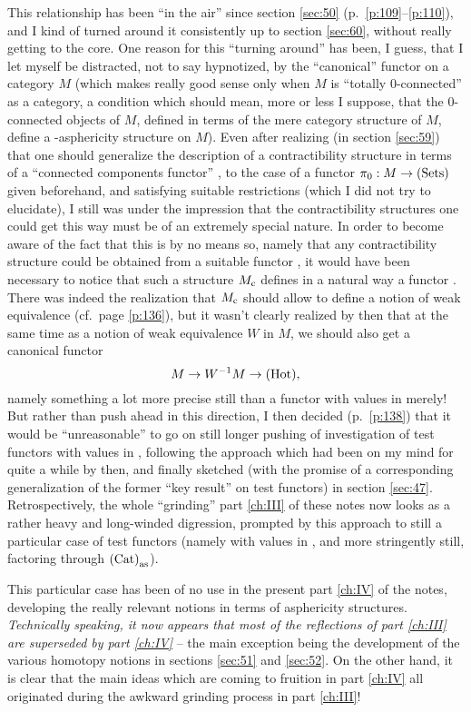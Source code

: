 This relationship has been ``in the air'' since section \ref{sec:50}
(p.\ \ref{p:109}--\ref{p:110}), and I kind of turned around it
consistently up to section \ref{sec:60}, without really getting to the
core. One reason for this ``turning around'' has been, I guess, that I
let myself be distracted, not to say hypnotized, by the ``canonical''
\piz{} functor on a category $M$ (which makes really good sense only
when $M$ is ``totally $0$-connected'' as a category, a condition which
should mean, more or less I suppose, that the $0$-connected objects of
$M$, defined in terms of the mere category structure of $M$, define a
\scrWz-asphericity structure on $M$). Even after realizing (in section
\ref{sec:59}) that one should generalize the description of a
contractibility structure in terms of a ``connected components
functor'' \piz, to the case of a functor ${\pi_0}: M\to{\ensuremath{(\mathrm{Sets})}}$ given
beforehand, and satisfying suitable restrictions (which I did not try
to elucidate), I still was under the impression that the
contractibility structures one could get this way must be of an
extremely special nature. In order to become aware of the fact that
this is by no means so, namely that any contractibility structure
could be obtained from a suitable functor \piz, it would have been
necessary to notice that such a structure $M_{\mathrm{c}}$ defines in a
natural way a functor \piz. There was indeed the realization that
$M_{\mathrm{c}}$ should allow to define a notion of weak equivalence (cf.\
page \ref{p:136}), but it wasn't clearly realized by then that at the
same time as a notion of weak equivalence $W$ in $M$, we should also
get a canonical functor
\[M \to W^{-1}M \to {\ensuremath{(\mathrm{Hot})}},\]
namely something a lot more precise still than a functor with values
in \Sets{} merely! But rather than push ahead in this direction, I
then decided (p.\ \ref{p:138}) that it would be ``unreasonable'' to go
on still longer pushing of investigation of test functors with values
in \Cat, following the approach which had been on my mind for quite a
while by then, and finally sketched (with the promise of a
corresponding generalization of the former ``key result'' on test
functors) in section \ref{sec:47}. Retrospectively, the whole
``grinding'' part \ref{ch:III} of these notes now looks as a rather
heavy and long-winded digression, prompted by this approach to still a
particular case of test functors (namely with values in \Cat, and
more stringently still, factoring through ${(\mathrm{Cat})}_{\mathrm{as}}$).

This particular case has been of no use in the present part
\ref{ch:IV} of the notes, developing the really relevant notions in
terms of asphericity structures. \emph{Technically speaking, it now
  appears that most of the reflections of part \ref{ch:III} are
  superseded by part \ref{ch:IV}} -- the main exception being the
development of the\pspage{264} various homotopy notions in sections
\ref{sec:51} and \ref{sec:52}. On the other hand, it is clear that the
main ideas which are coming to fruition in part \ref{ch:IV} all
originated during the awkward grinding process in part \ref{ch:III}!

